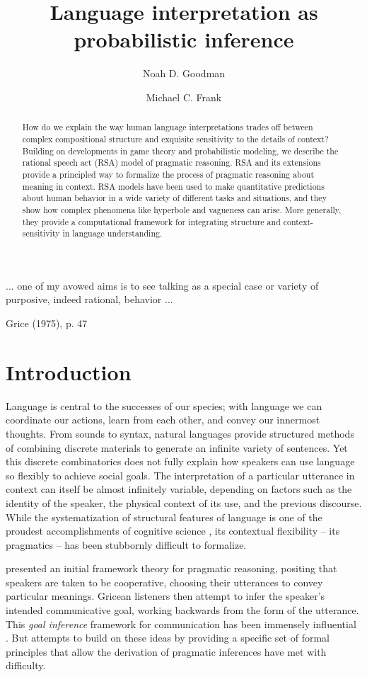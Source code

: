 \documentclass[]{elsarticle}
\title{Language interpretation as probabilistic inference}
\author[stan]{Noah D. Goodman\corref{cor1}}
\author[stan]{Michael C. Frank}
\begin{document}
\begin{abstract}
How do we explain the way human language interpretations trades off between complex compositional structure and exquisite sensitivity to the details of context? Building on developments in game theory and probabilistic modeling, we describe the rational speech act (RSA) model of pragmatic reasoning. RSA and its extensions provide a principled way to formalize the process of pragmatic reasoning about meaning in context. RSA models have been used to make quantitative predictions about human behavior in a wide variety of different tasks and situations, and they show how complex phenomena like hyperbole and vagueness can arise. More generally, they provide a computational framework for integrating structure and context-sensitivity in language understanding.
\end{abstract}

\maketitle

\epigraph{... one of my avowed aims is to see talking as a special case or
variety of purposive, indeed rational, behavior ...}{Grice (1975),
p. 47}

\section{Introduction}\label{introduction}

Language is central to the successes of our species; with language we
can coordinate our actions, learn from each other, and convey our
innermost thoughts. From sounds to syntax, natural languages provide
structured methods of combining discrete materials to generate an
infinite variety of sentences. Yet this discrete combinatorics does not
fully explain how speakers can use language so flexibly to achieve
social goals. The interpretation of a particular utterance in context
can itself be almost infinitely variable, depending on factors such as
the identity of the speaker, the physical context of its use, and the
previous discourse. While the systematization of structural features of
language is one of the proudest accomplishments of cognitive science \citep[e.g.,][]{chomsky1965,jackendoff2002,goldberg2003}, its contextual
flexibility -- its pragmatics -- has been stubbornly difficult to
formalize.

\citet{grice1975} presented an initial framework theory for pragmatic
reasoning, positing that speakers are taken to be cooperative, choosing
their utterances to convey particular meanings. Gricean listeners then
attempt to infer the speaker's intended communicative goal, working
backwards from the form of the utterance. This \emph{goal inference}
framework for communication has been immensely influential \cite[e.g.,][]{horn1984,sperber1986,clark1996,levinson2000}. But
attempts to build on these ideas by providing a specific set of formal
principles that allow the derivation of pragmatic inferences have met
with difficulty.
\end{document}
